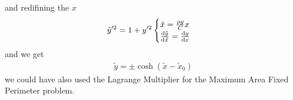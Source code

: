 \documentclass[../main.tex]{subfiles}
\begin{document}
and redifining the $x$
\begin{align*}
    \tilde y'^2 = 1 + y'^2
    \begin{cases}
        \tilde x = \frac{\rho g}{C} x \\
        \dv{\tilde y}{\tilde x} = \dv{y}{x}
    \end{cases}
\end{align*}
and we get
\begin{align*}
    \tilde y = \pm \cosh(\tilde x - \tilde x_0)
\end{align*}
we could have also used the Lagrange Multiplier for the Maximum Area Fixed Perimeter problem.
\end{document}
